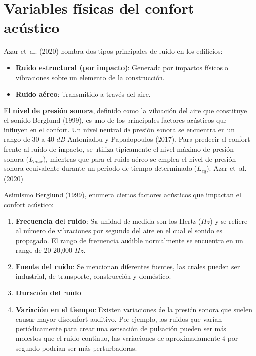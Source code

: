 \documentclass[
  letterpaper,
]{scrbook}
\begin{document}
\section{Variables físicas del confort
acústico}\label{variables-fuxedsicas-del-confort-acuxfastico}

Azar et~al. (2020) nombra dos tipos principales de ruido en los
edificios:

\begin{itemize}
\item
  \textbf{Ruido estructural (por impacto)}: Generado por impactos
  físicos o vibraciones sobre un elemento de la construcción.
\item
  \textbf{Ruido aéreo}: Transmitido a través del aire.
\end{itemize}

El \textbf{nivel de presión sonora}, definido como la vibración del aire
que constituye el sonido Berglund (1999), es uno de los principales
factores acústicos que influyen en el confort. Un nivel neutral de
presión sonora se encuentra en un rango de 30 a 40 \(dB\) Antoniadou y
Papadopoulos (2017). Para predecir el confort frente al ruido de
impacto, se utiliza típicamente el nivel máximo de presión sonora
(\(L_{max}\)), mientras que para el ruido aéreo se emplea el nivel de
presión sonora equivalente durante un periodo de tiempo determinado
(\(L_{eq}\)). Azar et~al. (2020)

Asimismo Berglund (1999), enumera ciertos factores acústicos que
impactan el confort acústico:

\begin{enumerate}
\def\labelenumi{\arabic{enumi}.}
\item
  \textbf{Frecuencia del ruido}: Su unidad de medida son los Hertz
  (\(Hz\)) y se refiere al número de vibraciones por segundo del aire en
  el cual el sonido es propagado. El rango de frecuencia audible
  normalmente se encuentra en un rango de 20-20,000 \(Hz\).
\item
  \textbf{Fuente del ruido}: Se mencionan diferentes fuentes, las cuales
  pueden ser industrial, de transporte, construcción y doméstico.
\item
  \textbf{Duración del ruido}
\item
  \textbf{Variación en el tiempo}: Existen variaciones de la presión
  sonora que suelen causar mayor disconfort auditivo. Por ejemplo, los
  ruidos que varían periódicamente para crear una sensación de pulsación
  pueden ser más molestos que el ruido continuo, las variaciones de
  aproximadamente 4 por segundo podrían ser más perturbadoras.
\end{enumerate}
\end{document}
